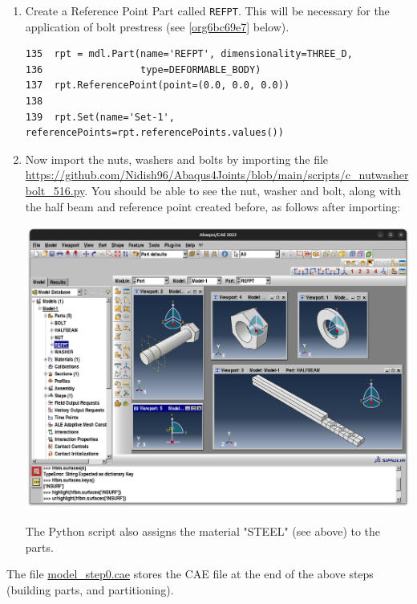 \documentclass[11pt]{article}
\begin{document}
\begin{enumerate}
\item Create a Reference Point Part called \texttt{REFPT}.
This will be necessary for the application of bolt prestress (see \ref{org6bc69e7} below).
\begin{verbatim}
135  rpt = mdl.Part(name='REFPT', dimensionality=THREE_D, 
136                 type=DEFORMABLE_BODY)
137  rpt.ReferencePoint(point=(0.0, 0.0, 0.0))
138  
139  rpt.Set(name='Set-1', referencePoints=rpt.referencePoints.values())
\end{verbatim}
\item Now import the nuts, washers and bolts by importing the file \url{https://github.com/Nidish96/Abaqus4Joints/blob/main/scripts/c\_nutwasherbolt\_516.py}.
You should be able to see the nut, washer and bolt, along with the half beam and reference point created before, as follows after importing:
\begin{center}
\includegraphics[width=.9\linewidth]{./figs/nwb.png}
\end{center}
The Python script also assigns the material "STEEL" (see above) to the parts.
\end{enumerate}

The file \href{https://github.com/Nidish96/Abaqus4Joints/blob/main/assets/assembly/model\_step0.cae}{model\_step0.cae} stores the CAE file at the end of the above steps (building parts, and partitioning).
\end{document}
